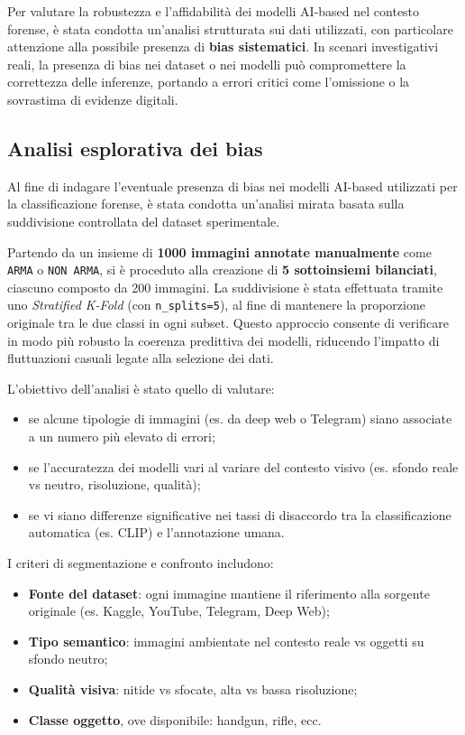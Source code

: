 Per valutare la robustezza e l’affidabilità dei modelli AI-based nel contesto forense, è stata condotta un’analisi strutturata sui dati utilizzati, con particolare attenzione alla possibile presenza di \textbf{bias sistematici}. In scenari investigativi reali, la presenza di bias nei dataset o nei modelli può compromettere la correttezza delle inferenze, portando a errori critici come l'omissione o la sovrastima di evidenze digitali.





\subsection{Analisi esplorativa dei bias}
\label{subsec:exploratory-bias}

Al fine di indagare l’eventuale presenza di bias nei modelli AI-based utilizzati per la classificazione forense, è stata condotta un’analisi mirata basata sulla suddivisione controllata del dataset sperimentale.

Partendo da un insieme di \textbf{1000 immagini annotate manualmente} come \texttt{ARMA} o \texttt{NON ARMA}, si è proceduto alla creazione di \textbf{5 sottoinsiemi bilanciati}, ciascuno composto da 200 immagini. La suddivisione è stata effettuata tramite uno \textit{Stratified K-Fold} (con \texttt{n\_splits=5}), al fine di mantenere la proporzione originale tra le due classi in ogni subset. Questo approccio consente di verificare in modo più robusto la coerenza predittiva dei modelli, riducendo l’impatto di fluttuazioni casuali legate alla selezione dei dati.

\medskip

L’obiettivo dell’analisi è stato quello di valutare:

\begin{itemize}
  \item se alcune tipologie di immagini (es. da deep web o Telegram) siano associate a un numero più elevato di errori;
  \item se l’accuratezza dei modelli vari al variare del contesto visivo (es. sfondo reale vs neutro, risoluzione, qualità);
  \item se vi siano differenze significative nei tassi di disaccordo tra la classificazione automatica (es. CLIP) e l’annotazione umana.
\end{itemize}

I criteri di segmentazione e confronto includono:

\begin{itemize}
  \item \textbf{Fonte del dataset}: ogni immagine mantiene il riferimento alla sorgente originale (es. Kaggle, YouTube, Telegram, Deep Web);
  \item \textbf{Tipo semantico}: immagini ambientate nel contesto reale vs oggetti su sfondo neutro;
  \item \textbf{Qualità visiva}: nitide vs sfocate, alta vs bassa risoluzione;
  \item \textbf{Classe oggetto}, ove disponibile: handgun, rifle, ecc.
\end{itemize}

